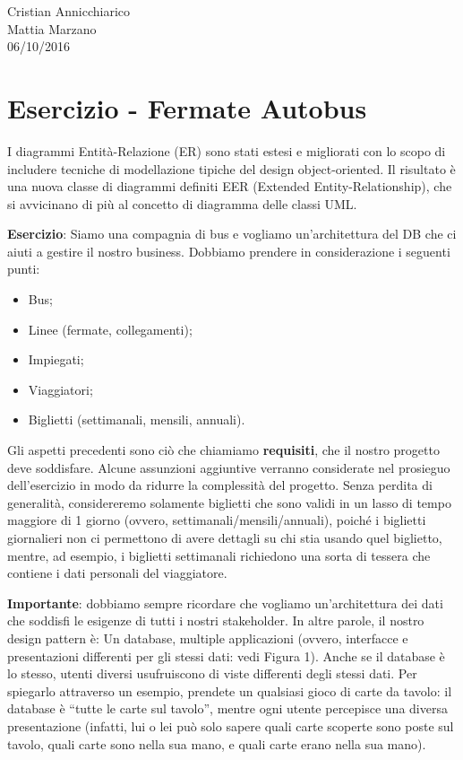 \begin{flushright}Cristian Annicchiarico\\Mattia Marzano\\06/10/2016\end{flushright}


\section{Esercizio - Fermate Autobus}

I diagrammi Entità-Relazione (ER) sono stati estesi e migliorati con lo scopo di includere tecniche di modellazione tipiche del design object-oriented. Il risultato è una nuova classe di diagrammi definiti EER (Extended Entity-Relationship), che si avvicinano di più al concetto di diagramma delle classi UML. 

\textbf{Esercizio}: Siamo una compagnia di bus e vogliamo un’architettura del DB che ci aiuti a gestire il nostro business. Dobbiamo prendere in considerazione i seguenti punti:

\begin{itemize}

\item Bus;
\item Linee (fermate, collegamenti);
\item Impiegati;
\item Viaggiatori;
\item Biglietti (settimanali, mensili, annuali).

\end{itemize}

Gli aspetti precedenti sono ciò che chiamiamo \textbf{requisiti}, che il nostro progetto deve soddisfare. Alcune assunzioni aggiuntive verranno considerate nel prosieguo dell’esercizio in modo da ridurre la complessità del progetto. Senza perdita di generalità, considereremo solamente biglietti che sono validi in un lasso di tempo maggiore di 1 giorno (ovvero, settimanali/mensili/annuali), poiché i biglietti giornalieri non ci permettono di avere dettagli su chi stia usando quel biglietto, mentre, ad esempio, i biglietti settimanali richiedono una sorta di tessera che contiene i dati personali del viaggiatore. 

\textbf{Importante}: dobbiamo sempre ricordare che vogliamo un’architettura dei dati che soddisfi le esigenze di tutti i nostri stakeholder. In altre parole, il nostro design pattern è: Un database, multiple applicazioni (ovvero, interfacce e presentazioni differenti per gli stessi dati: vedi Figura 1). Anche se il database è lo stesso, utenti diversi usufruiscono di viste differenti degli stessi dati. Per spiegarlo attraverso un esempio, prendete un qualsiasi gioco di carte da tavolo: il database è “tutte le carte sul tavolo”, mentre ogni utente percepisce una diversa presentazione (infatti, lui o lei può solo sapere quali carte scoperte sono poste sul tavolo, quali carte sono nella sua mano, e quali carte erano nella sua mano).   

